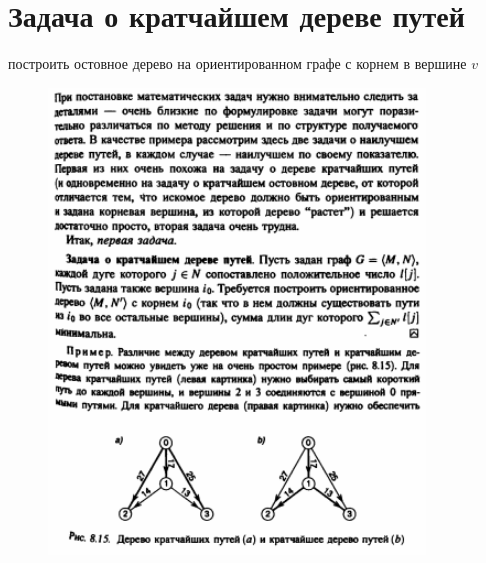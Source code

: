 \documentclass[discrete.tex]{subfiles}
\begin{document}
  \section{Задача о кратчайшем дереве путей}

  \begin{task}
      построить остовное дерево на ориентированном графе с корнем в вершине $v$
  \end{task}

  \begin{figure}[H]
          \includegraphics[width=10cm]{pics/47_1}
          \centering
  \end{figure}
\end{document}
